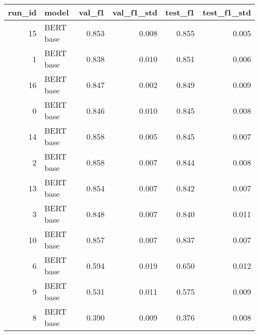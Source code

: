 \begin{tabular}{rlrrrr}
\toprule
 run\_id &     model &  val\_f1 &  val\_f1\_std &  test\_f1 &  test\_f1\_std \\
\midrule
     15 & BERT base &   0.853 &       0.008 &    0.855 &        0.005 \\
      1 & BERT base &   0.838 &       0.010 &    0.851 &        0.006 \\
     16 & BERT base &   0.847 &       0.002 &    0.849 &        0.009 \\
      0 & BERT base &   0.846 &       0.010 &    0.845 &        0.008 \\
     14 & BERT base &   0.858 &       0.005 &    0.845 &        0.007 \\
      2 & BERT base &   0.858 &       0.007 &    0.844 &        0.008 \\
     13 & BERT base &   0.854 &       0.007 &    0.842 &        0.007 \\
      3 & BERT base &   0.848 &       0.007 &    0.840 &        0.011 \\
     10 & BERT base &   0.857 &       0.007 &    0.837 &        0.007 \\
      6 & BERT base &   0.594 &       0.019 &    0.650 &        0.012 \\
      9 & BERT base &   0.531 &       0.011 &    0.575 &        0.009 \\
      8 & BERT base &   0.390 &       0.009 &    0.376 &        0.008 \\
\bottomrule
\end{tabular}
